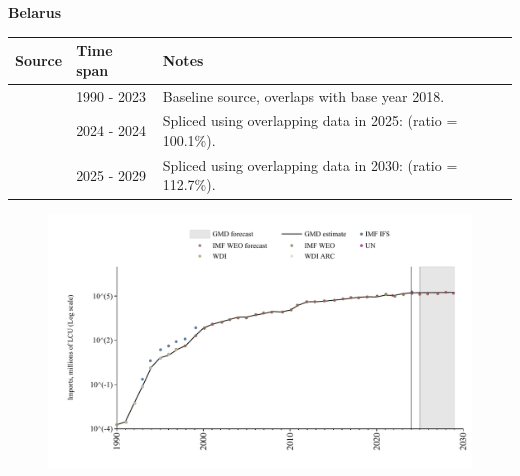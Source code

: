 \documentclass[12pt,a4paper,landscape]{article}
\begin{document}
\begin{adjustbox}{max totalsize={\paperwidth}{\paperheight},center}
\begin{minipage}[t][\textheight][t]{\textwidth}
\vspace*{0.5cm}
{}
\begin{center}
{\Large\bfseries Belarus}
\end{center}
\vspace{0.5cm}
\begin{table}[H]
\centering
\small
\begin{tabular}{|l|l|l|}
\hline
\textbf{Source} & \textbf{Time span} & \textbf{Notes} \\
\hline
\rowcolor{white}\cite{WDI}& 1990 - 2023 &Baseline source, overlaps with base year 2018.\\
\rowcolor{lightgray}\cite{IMF_IFS}& 2024 - 2024 &Spliced using overlapping data in 2025: (ratio = 100.1\%).\\
\rowcolor{white}\cite{IMF_WEO_forecast}& 2025 - 2029 &Spliced using overlapping data in 2030: (ratio = 112.7\%).\\
\hline
\end{tabular}
\end{table}
\begin{figure}[H]
\centering
\includegraphics[width=\textwidth,height=0.6\textheight,keepaspectratio]{graphs/BLR_imports.pdf}
\end{figure}
\end{minipage}
\end{adjustbox}
\end{document}
